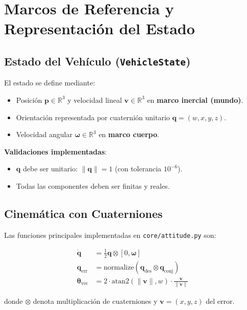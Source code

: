 \documentclass[12pt,a4paper]{article}
\begin{document}
\section{Marcos de Referencia y Representación del Estado}

\subsection{Estado del Vehículo (\texttt{VehicleState})}

El estado se define mediante:

\begin{itemize}
    \item Posición $\mathbf{p} \in \mathbb{R}^3$ y velocidad lineal $\mathbf{v} \in \mathbb{R}^3$ en \textbf{marco inercial (mundo)}.
    \item Orientación representada por cuaternión unitario $\mathbf{q} = (w, x, y, z)$.
    \item Velocidad angular $\boldsymbol{\omega} \in \mathbb{R}^3$ en \textbf{marco cuerpo}.
\end{itemize}

\textbf{Validaciones implementadas}:
\begin{itemize}
    \item $\mathbf{q}$ debe ser unitario: $\|\mathbf{q}\| = 1$ (con tolerancia $10^{-6}$).
    \item Todas las componentes deben ser finitas y reales.
\end{itemize}

\subsection{Cinemática con Cuaterniones}

Las funciones principales implementadas en \texttt{core/attitude.py} son:

\begin{align}
    \dot{\mathbf{q}} &= \frac{1}{2} \mathbf{q} \otimes [0, \boldsymbol{\omega}] \\
    \mathbf{q}_{\text{err}} &= \text{normalize}(\mathbf{q}_{\text{des}} \otimes \mathbf{q}_{\text{conj}}) \\
    \boldsymbol{\theta}_{\text{vec}} &= 2 \cdot \text{atan2}(\|\mathbf{v}\|, w) \cdot \frac{\mathbf{v}}{\|\mathbf{v}\|}
\end{align}

donde $\otimes$ denota multiplicación de cuaterniones y $\mathbf{v} = (x,y,z)$ del error.
\end{document}
